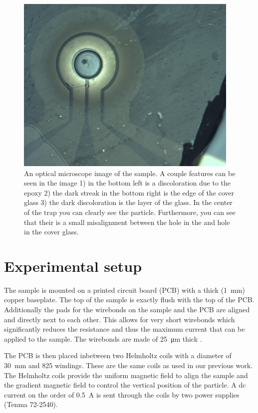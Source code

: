 \begin{figure}
    \centering
    \includegraphics{figures/sample/trap_optical_microscope.pdf}
    \caption{An optical microscope image of the sample. A couple features can be seen in the image 1) in the bottom left is a discoloration due to the epoxy 2) the dark streak in the bottom right is the edge of the cover glass 3) the dark discoloration is the  layer of the glass. In the center of the trap you can clearly see the  particle. Furthermore, you can see that their is a small misalignment between the hole in the  and hole in the cover glass.}
    \label{fig:optical-microscope-image-sample}
\end{figure}

\section{Experimental setup}
The sample is mounted on a printed circuit board (PCB) with a thick (\qty{1}{\mm}) copper baseplate. The top of the sample is exactly flush with the top of the PCB. Additionally the pads for the wirebonds on the sample and the PCB are aligned and directly next to each other. This allows for very short wirebonds which significantly reduces the resistance and thus the maximum current that can be applied to the sample. The wirebonds are made of \qty{25}{\um} thick .

The PCB is then placed inbetween two Helmholtz coils with a diameter of \qty{30}{\mm} and 825 windings. These are the same coils as used in our previous work\cite{eli,mart}. The Helmholtz coils provide the uniform magnetic field to align the sample and the gradient magnetic field to control the vertical position of the particle. A dc current on the order of \qty{0.5}{\ampere} is sent through the coils by two power supplies (Tenma 72-2540).

